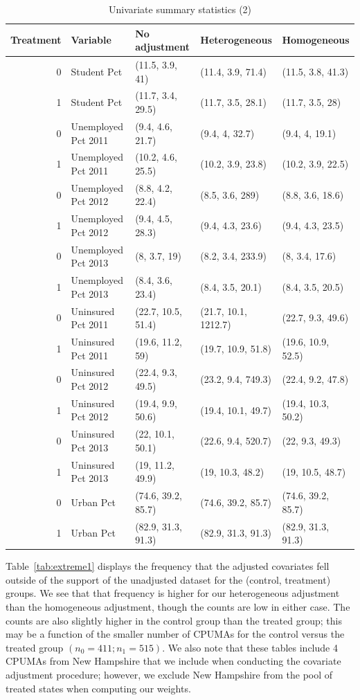\begin{table}[h!]
\centering
    \caption{Univariate summary statistics (2)}
    \label{tab:summarytab2}
\begin{tabular}{rllll}
  \hline
Treatment & Variable & No adjustment & Heterogeneous & Homogeneous \\ 
  \hline
  0 & Student Pct & (11.5, 3.9, 41) & (11.4, 3.9, 71.4) & (11.5, 3.8, 41.3) \\ 
  1 & Student Pct & (11.7, 3.4, 29.5) & (11.7, 3.5, 28.1) & (11.7, 3.5, 28) \\ 
  0 & Unemployed Pct 2011 & (9.4, 4.6, 21.7) & (9.4, 4, 32.7) & (9.4, 4, 19.1) \\ 
  1 & Unemployed Pct 2011 & (10.2, 4.6, 25.5) & (10.2, 3.9, 23.8) & (10.2, 3.9, 22.5) \\ 
  0 & Unemployed Pct 2012 & (8.8, 4.2, 22.4) & (8.5, 3.6, 289) & (8.8, 3.6, 18.6) \\ 
  1 & Unemployed Pct 2012 & (9.4, 4.5, 28.3) & (9.4, 4.3, 23.6) & (9.4, 4.3, 23.5) \\ 
  0 & Unemployed Pct 2013 & (8, 3.7, 19) & (8.2, 3.4, 233.9) & (8, 3.4, 17.6) \\ 
  1 & Unemployed Pct 2013 & (8.4, 3.6, 23.4) & (8.4, 3.5, 20.1) & (8.4, 3.5, 20.5) \\ 
  0 & Uninsured Pct 2011 & (22.7, 10.5, 51.4) & (21.7, 10.1, 1212.7) & (22.7, 9.3, 49.6) \\ 
  1 & Uninsured Pct 2011 & (19.6, 11.2, 59) & (19.7, 10.9, 51.8) & (19.6, 10.9, 52.5) \\ 
  0 & Uninsured Pct 2012 & (22.4, 9.3, 49.5) & (23.2, 9.4, 749.3) & (22.4, 9.2, 47.8) \\ 
  1 & Uninsured Pct 2012 & (19.4, 9.9, 50.6) & (19.4, 10.1, 49.7) & (19.4, 10.3, 50.2) \\ 
  0 & Uninsured Pct 2013 & (22, 10.1, 50.1) & (22.6, 9.4, 520.7) & (22, 9.3, 49.3) \\ 
  1 & Uninsured Pct 2013 & (19, 11.2, 49.9) & (19, 10.3, 48.2) & (19, 10.5, 48.7) \\ 
  0 & Urban Pct & (74.6, 39.2, 85.7) & (74.6, 39.2, 85.7) & (74.6, 39.2, 85.7) \\ 
  1 & Urban Pct & (82.9, 31.3, 91.3) & (82.9, 31.3, 91.3) & (82.9, 31.3, 91.3) \\ 
  \hline
\end{tabular}
\end{table}

Table~\ref{tab:extreme1} displays the frequency that the adjusted covariates fell outside of the support of the unadjusted dataset for the (control, treatment) groups. We see that that frequency is higher for our heterogeneous adjustment than the homogeneous adjustment, though the counts are low in either case. The counts are also slightly higher in the control group than the treated group; this may be a function of the smaller number of CPUMAs for the control versus the treated group $(n_0 = 411; n_1 = 515)$. We also note that these tables include 4 CPUMAs from New Hampshire that we include when conducting the covariate adjustment procedure; however, we exclude New Hampshire from the pool of treated states when computing our weights.

